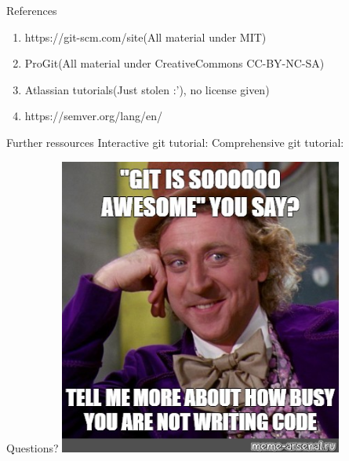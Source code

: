 \documentclass{beamer}
\begin{document}
\begin{frame}[fragile,t]{References}\vspace{10pt}
  \begin{enumerate}
    \item https://git-scm.com/site(All material under MIT)
    \item ProGit(All material under CreativeCommons CC-BY-NC-SA)
    \item Atlassian tutorials(Just stolen :'), no license given)
    \item https://semver.org/lang/en/
  \end{enumerate}
\end{frame}

\begin{frame}[fragile,t]{Further ressources}\vspace{10pt}
  Interactive git tutorial: %
  Comprehensive git tutorial: %
\end{frame}

\begin{frame}{Questions?}
  \centering
      \includegraphics[width=0.7\textwidth,height=0.7\textheight]{memes/git_awesome.jpg}
\end{frame}
\end{document}
